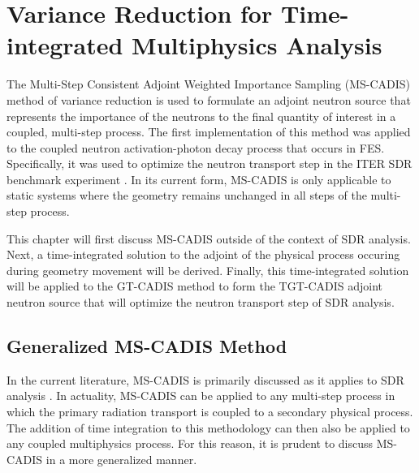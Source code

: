 \chapter{Variance Reduction for Time-integrated Multiphysics Analysis}\label{ch:ti}

The Multi-Step Consistent Adjoint Weighted Importance Sampling (MS-CADIS)
method of variance reduction is used to formulate an adjoint neutron source
that represents the importance of the neutrons to the final quantity of interest
in a coupled, multi-step process. The first implementation of this method 
was applied to the coupled neutron activation-photon decay process that occurs
in FES.  Specifically, it
was used to optimize the neutron transport step in the 
ITER SDR benchmark experiment \cite{mscadis}.
In its current form, MS-CADIS is only applicable to static systems where
the geometry remains unchanged in all steps of the multi-step process.

This chapter will first discuss MS-CADIS outside of the context of SDR analysis. 
Next, a time-integrated solution to the adjoint of the 
physical process occuring during geometry movement will be derived.  
Finally, this time-integrated solution will be applied to the GT-CADIS method to
form the TGT-CADIS adjoint neutron source that will optimize the neutron
transport step of SDR analysis.

\section{Generalized MS-CADIS Method}
In the current literature, MS-CADIS is primarily discussed as it applies to SDR
analysis \cite{mscadis}.  In actuality, MS-CADIS can be applied to any multi-step process in
which the primary radiation transport is coupled to a secondary physical process.
The addition of time integration to this methodology can then also be applied to
any coupled multiphysics process. For this reason, it is prudent to discuss
MS-CADIS in a more generalized manner.

